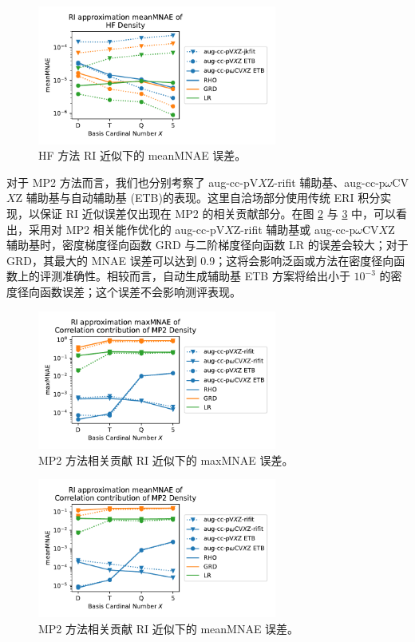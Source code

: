 \begin{figure}[hp]
  \centering
  \caption{HF 方法 RI 近似下的 meanMNAE 误差。}
  \label{fig.HF-RI-mean}
  \includegraphics[width=0.7\textwidth]{assets/HF-RI-mean.pdf}
\end{figure}

对于 MP2 方法而言，我们也分别考察了 aug-cc-pV$X$Z-rifit 辅助基\cite{Weigend-Haettig.JCP.2002}、aug-cc-p$\omega$CV$X$Z 辅助基\cite{10.1039/b415208e}与自动辅助基 (ETB)\cite{Stoychev-Neese.JCTC.2017}的表现。这里自洽场部分使用传统 ERI 积分实现，以保证 RI 近似误差仅出现在 MP2 的相关贡献部分。在图 \ref{fig.MP2-RI-err} 与 \ref{fig.MP2-RI-mean} 中，可以看出，采用对 MP2 相关能作优化的 aug-cc-pV$X$Z-rifit 辅助基或 aug-cc-p$\omega$CV$X$Z 辅助基时，密度梯度径向函数 GRD 与二阶梯度径向函数 LR 的误差会较大；对于 GRD，其最大的 MNAE 误差可以达到 0.9；这将会影响泛函或方法在密度径向函数上的评测准确性。相较而言，自动生成辅助基 ETB 方案将给出小于 $10^{-3}$ 的密度径向函数误差；这个误差不会影响测评表现。

\begin{figure}[hp]
  \centering
  \caption{MP2 方法相关贡献 RI 近似下的 maxMNAE 误差。}
  \label{fig.MP2-RI-err}
  \includegraphics[width=0.7\textwidth]{assets/MP2-RI-err.pdf}
\end{figure}

\begin{figure}[hp]
  \centering
  \caption{MP2 方法相关贡献 RI 近似下的 meanMNAE 误差。}
  \label{fig.MP2-RI-mean}
  \includegraphics[width=0.7\textwidth]{assets/MP2-RI-mean.pdf}
\end{figure}

